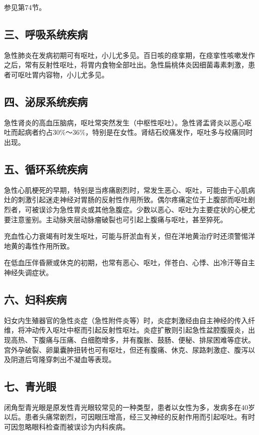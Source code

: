 参见第74节。

\subsection{三、呼吸系统疾病}

急性肺炎在发病初期可有呕吐，小儿尤多见。百日咳的痉挛期，在痉挛性咳嗽发作之后，常有反射性呕吐，将胃内食物全部吐出。急性扁桃体炎因细菌毒素刺激，患者可呕吐胃内容物，小儿尤多见。

\subsection{四、泌尿系统疾病}

急性肾炎的高血压脑病，呕吐常突然发生（中枢性呕吐）。急性肾盂肾炎以恶心呕吐而起病者约占30\%～36\%，特别是在女性。肾结石绞痛发作，呕吐多与绞痛同时出现。

\subsection{五、循环系统疾病}

急性心肌梗死的早期，特别是当疼痛剧烈时，常发生恶心、呕吐，可能由于心肌病灶的刺激引起迷走神经对胃肠的反射性作用所致。偶尔疼痛定位于上腹部而呕吐剧烈者，可被误诊为急性胃炎或其他急腹症。少数以恶心、呕吐为主要症状的心梗尤要注意鉴别。主动脉夹层动脉瘤破裂也可引起上腹痛与呕吐，甚至猝死。

充血性心力衰竭有时发生呕吐，可能与肝淤血有关，但在洋地黄治疗时还须警惕洋地黄的毒性作用所致。

在低血压伴昏厥或休克的初期，也常有恶心、呕吐，伴苍白、心悸、出冷汗等自主神经失调症状。

\subsection{六、妇科疾病}

妇女内生殖器官的急性炎症（急性附件炎等）时，炎症刺激经由自主神经的传入纤维，将冲动传入呕吐中枢而引起反射性呕吐。炎症扩散则引起急性盆腔腹膜炎，出现高热、下腹痛与压痛、白细胞增多，并有腹胀、鼓肠、便秘、排尿困难等症状。宫外孕破裂、卵巢囊肿扭转也可有呕吐，但还有腹痛、休克、尿路刺激症、腹泻以及阴道后穹隆穿刺出不凝血等表现。

\subsection{七、青光眼}

闭角型青光眼是原发性青光眼较常见的一种类型，患者以女性为多，发病多在40岁以后。患者头痛常剧烈，可因眼压增高，经三叉神经的反射作用而引起呕吐。有时可因忽略眼科检查而被误诊为内科疾病。

